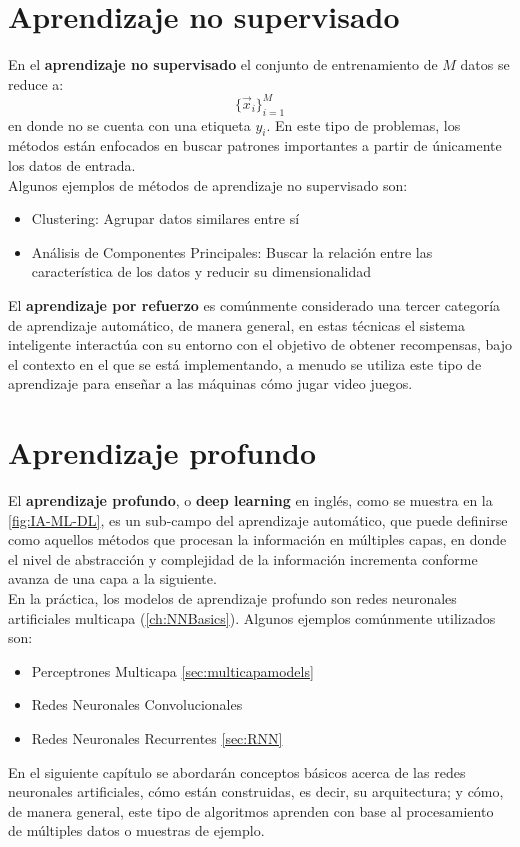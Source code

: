 \section{Aprendizaje no supervisado}
En el \textbf{aprendizaje no supervisado} el conjunto de entrenamiento de $M$ datos se reduce a:
\[ \{\vec{x}_i\}_{i=1}^M \]
en donde no se cuenta con una etiqueta $y_i$. En este tipo de problemas, los métodos están enfocados en buscar patrones importantes a partir de únicamente los datos de entrada.
\\
Algunos ejemplos de métodos de aprendizaje no supervisado son:
\begin{itemize}[label=\textcolor{CTtitle}{\textbullet}]
\item Clustering: Agrupar datos similares entre sí
\item Análisis de Componentes Principales: Buscar la relación entre las característica de los datos y reducir su dimensionalidad
\end{itemize}

El \textbf{aprendizaje por refuerzo} es comúnmente considerado una tercer categoría de aprendizaje automático, de manera general, en estas técnicas el sistema inteligente interactúa con su entorno con el objetivo de obtener recompensas, bajo el contexto en el que se está implementando, a menudo se utiliza este tipo de aprendizaje para enseñar a las máquinas cómo jugar video juegos. \cite{Ivan:2019}

\section{Aprendizaje profundo}
El \textbf{aprendizaje profundo}, o \textbf{deep learning} en inglés, como se muestra en la \autoref{fig:IA-ML-DL}, es un sub-campo del aprendizaje automático, que puede definirse como aquellos métodos que procesan la información en múltiples capas, en donde el nivel de abstracción y complejidad de la información incrementa conforme avanza de una capa a la siguiente.
\\
En la práctica, los modelos de aprendizaje profundo son redes neuronales artificiales multicapa (\autoref{ch:NNBasics}). Algunos ejemplos comúnmente utilizados son: \cite{Ivan:2019}
\begin{itemize}[label=\textcolor{CTtitle}{\textbullet}]
\item Perceptrones Multicapa \autoref{sec:multicapamodels}
\item Redes Neuronales Convolucionales
\item Redes Neuronales Recurrentes \autoref{sec:RNN}
\end{itemize}

En el siguiente capítulo se abordarán conceptos básicos acerca de las redes neuronales artificiales, cómo están construidas, es decir, su arquitectura; y cómo, de manera general, este tipo de algoritmos aprenden con base al procesamiento de múltiples datos o muestras de ejemplo.



